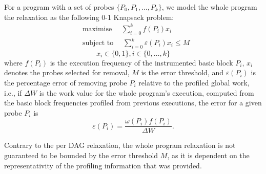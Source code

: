 For a program with a set of probes $\{P_0, P_1, \ldots, P_k\}$, we model the whole program the relaxation as the following 0-1 Knapsack problem:
\begin{equation*}
\begin{aligned}
& \textrm{maximise }\quad \sum_{i=0}^{k} f(P_i)x_i \\
& \textrm{subject to }\quad \sum_{i=0}^{k} \varepsilon(P_i)x_i \leq M
\end{aligned}
\end{equation*}
\[
x_i\in\{0,1\}, i\in\{0,\ldots,k\}
\]
where $f(P_i)$ is the execution frequency of the instrumented basic block $P_i$, $x_i$ denotes the probes selected for removal, $M$ is the error threshold, and $\varepsilon(P_i)$ is the percentage error of removing probe $P_i$ relative to the profiled global work, i.e.,
if $\Delta W$ is the work value for the whole program's execution, computed from the basic block frequencies profiled from previous executions, the error for a given probe $P_i$ is
\[
\varepsilon(P_i) = \frac{\omega(P_i)f(P_i)}{\Delta W}.
\]

Contrary to the per DAG relaxation, the whole program relaxation is not guaranteed to be bounded by the error threshold $M$,
as it is dependent on the representativity of the profiling information that was provided.

